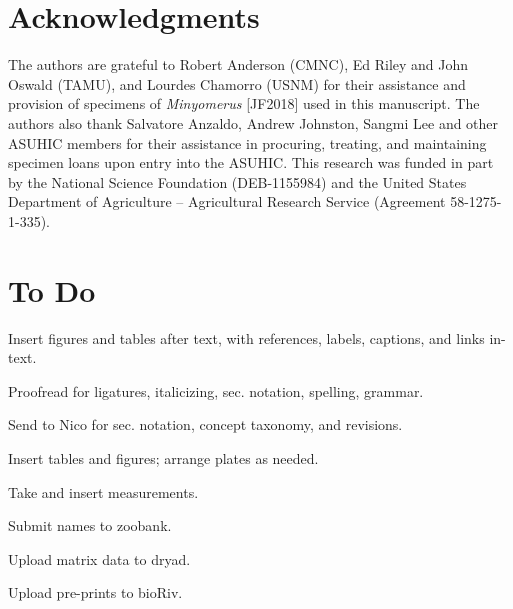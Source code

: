 \documentclass[fleqn,10pt,lineno]{wlpeerj} %
\begin{document}
		
\section*{Acknowledgments}
	The authors are grateful to Robert Anderson (CMNC), Ed Riley and John Oswald (TAMU), and Lourdes Chamorro (USNM) for their assistance and provision of specimens of \textit{Minyomerus} [JF2018] used in this manuscript.
	The authors also thank Salvatore Anzaldo, Andrew Johnston, Sangmi Lee and other ASUHIC members for their assistance in procuring, treating, and maintaining specimen loans upon entry into the ASUHIC.
	This research was funded in part by the National Science Foundation (DEB-1155984) and the United States Department of Agriculture – Agricultural Research Service (Agreement 58-1275-1-335).


\section*{To Do}
	\begin{description}[itemsep=-0.4em]
		\item[Saturday] Insert figures and tables after text, with references, labels, captions, and links in-text.
		\item[Saturday] Proofread for ligatures, italicizing, sec. notation, spelling, grammar.
		\item[Saturday] Send to Nico for sec. notation, concept taxonomy, and revisions.
		\item[Saturday] Insert tables and figures; arrange plates as needed.
		\item[Monday] Take and insert measurements.
		\item[Unspec.] Submit names to zoobank.
		\item[Unspec.] Upload matrix data to dryad.
		\item[Unspec.] Upload pre-prints to bioR{\textchi}iv.
	\end{description}

\newpage
 
\end{document}
